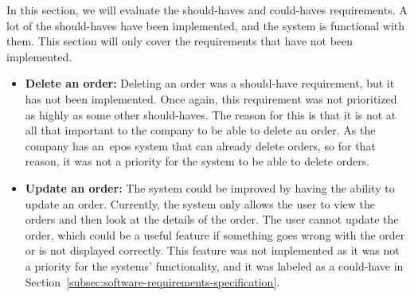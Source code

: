 In this section, we will evaluate the should-haves and could-haves requirements.
A lot of the should-haves have been implemented, and the system is functional with them.
This section will only cover the requirements that have not been implemented.

\begin{itemize}
    \item \textbf{Delete an order:}
    Deleting an order was a should-have requirement, but it has not been implemented.
    Once again, this requirement was not prioritized as highly as some other should-haves.
    The reason for this is that it is not at all that important to the company to be able to delete an order.
    As the company has an~\acrshort{epos} system that can already delete orders, so for that reason, it was not a
    priority for the system to be able to delete orders.

    \item \textbf{Update an order:}
    The system could be improved by having the ability to update an order.
    Currently, the system only allows the user to view the orders and then look at the details of the order.
    The user cannot update the order, which could be a useful feature if something goes wrong with the order or is not
    displayed correctly.
    This feature was not implemented as it was not a priority for the systems' functionality, and it was labeled as a
    could-have in Section~\ref{subsec:software-requirements-specification}.
\end{itemize}

